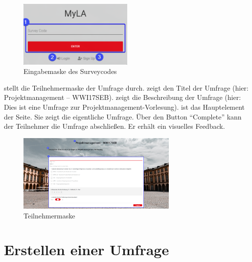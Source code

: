 
\begin{figure}[H]
	\centering
	\includegraphics[width=0.5\textwidth, keepaspectratio]{img/guide/SurveyCode.png}
	\captionsetup{justification=centering, format=plain}
	\caption[Eingabemaske Surveycode]{Eingabemaske des Surveycodes \\\quelleScreenshot}
	\label{fig:EingabemaskeSurveycode}
\end{figure}

\abb {} stellt die Teilnehmermaske der Umfrage durch. 
\desOne zeigt den Titel der Umfrage (hier: Projektmanagement -- WWI17SEB). 
\desTwo zeigt die Beschreibung der Umfrage (hier: Dies ist eine Umfrage zur Projektmanagement-Vorlesung). 
\desThree ist das Hauptelement der Seite.
Sie zeigt die eigentliche Umfrage.
Über den Button \enquote{Complete} kann der Teilnehmer die Umfrage abschließen. 
Er erhält ein visuelles Feedback. 

\begin{figure}[H]
	\centering
	\includegraphics[width=0.70\textwidth, keepaspectratio]{img/guide/SurveyParticipate.png}
	\captionsetup{justification=centering, format=plain}
	\caption[Teilnehmermaske]{Teilnehmermaske \\\quelleScreenshot}
	\label{fig:Teilnehmermaske}
\end{figure}

\section{Erstellen einer Umfrage}
\label{ssec:CreateMaster}

